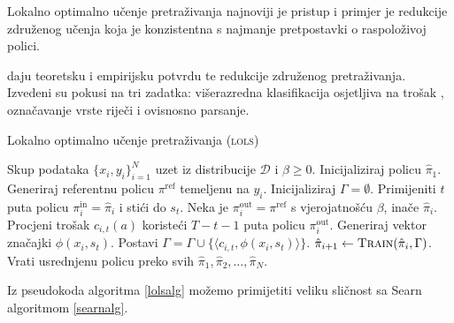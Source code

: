 Lokalno optimalno učenje pretraživanja 
najnoviji je pristup i primjer je redukcije združenog učenja koja je
konzistentna s najmanje pretpostavki o raspoloživoj polici.

\cite{daume15lols} daju teoretsku i empirijsku potvrdu te redukcije združenog
pretraživanja. Izvedeni su pokusi na tri zadatka: višerazredna klasifikacija
osjetljiva na trošak ,
označavanje vrste riječi i ovisnosno parsanje.

\begin{algorithm}
\caption{Lokalno optimalno učenje pretraživanja (\textsc{lols})}\label{lolsalg}
\begin{algorithmic}[1]
\Require Skup podataka $\{x_i, y_i\}_{i=1}^N$ uzet iz distribucije $\mathcal{D}$
         i $\beta \geq 0$. %
\State Inicijaliziraj policu $\hat{\pi}_1$.
  \State Generiraj referentnu policu $\pi^{\text{ref}}$ temeljenu na $y_i$.
  \State Inicijaliziraj $\Gamma = \emptyset$. 
    \State Primijeniti $t$ puta policu $\pi_{i}^{\text{in}} = \hat{\pi}_i$  i stići do $s_t$. 
      \State Neka je  $\pi_{i}^{\text{out}} = \pi^{\text{ref}}$ s vjerojatnošću $\beta$, inače $\hat{\pi}_i$.
      \State Procjeni trošak $c_{i,t}(a)$ koristeći $T-t-1$ puta policu $\pi_{i}^{\text{out}}$. 
    \EndFor
    \State Generiraj vektor značajki $\phi(x_i, s_t)$.
    \State Postavi $\Gamma = \Gamma \cup \{\langle c_{i,t}, \phi(x_i, s_t) \rangle\}$.
  \EndFor
  \State $\hat{\pi}_{i+1} \gets \textsc{Train}(\hat{\pi}_i, \Gamma)$.
\EndFor
\State Vrati usrednjenu policu preko svih $\hat{\pi}_1, \hat{\pi}_2, \ldots, \hat{\pi}_N$.
\end{algorithmic}
\end{algorithm}

Iz pseudokoda algoritma \ref{lolsalg} možemo primijetiti veliku sličnost sa
Searn algoritmom \ref{searnalg}.
